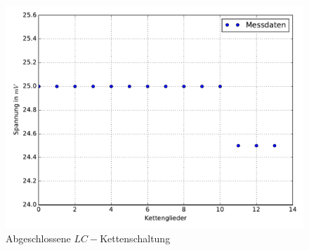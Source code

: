 \begin{figure}
  \includegraphics[width=\textwidth]{Messung_e.pdf}
  \caption{Abgeschlossene $LC-$Kettenschaltung}
  \label{fig:Messung_e}
\end{figure}



